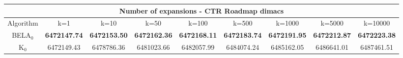 \begin{tabular}{c|cccccccc}\toprule
\multicolumn{9}{c}{Number of expansions - CTR Roadmap dimacs}\\ \midrule
Algorithm & k=1 & k=10 & k=50 & k=100 & k=500 & k=1000 & k=5000 & k=10000 \\ \midrule
BELA$_0$ & \textbf{6472147.74} & \textbf{6472153.50} & \textbf{6472162.36} & \textbf{6472168.11} & \textbf{6472183.74} & \textbf{6472191.95} & \textbf{6472212.87} & \textbf{6472223.38} \\
K$_0$ & 6472149.43 & 6478786.36 & 6481023.66 & 6482057.99 & 6484074.24 & 6485162.05 & 6486641.01 & 6487461.51 \\ \bottomrule 
\end{tabular}
